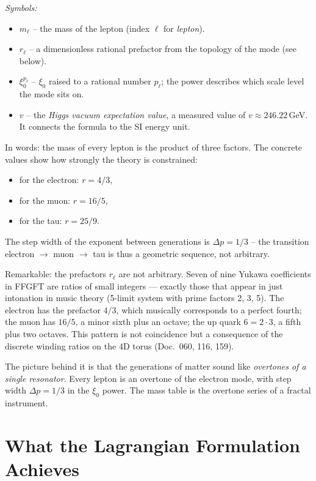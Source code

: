 \noindent\textit{Symbols:}
\begin{itemize}\setlength\itemsep{0pt}
  \item $m_\ell$ -- the mass of the lepton (index $\ell$ for
        \emph{lepton}).
  \item $r_\ell$ -- a dimensionless rational prefactor from the
        topology of the mode (see below).
  \item $\xi_0^{p_\ell}$ -- $\xi_0$ raised to a rational number
        $p_\ell$; the power describes which scale level the mode
        sits on.
  \item $v$ -- the \emph{Higgs vacuum expectation value}, a measured
        value of $v \approx 246{.}22$\,GeV. It connects the formula
        to the SI energy unit.
\end{itemize}

\medskip\noindent

In words: the mass of every lepton is the product of three factors.
The concrete values show how strongly the theory is constrained:
\begin{itemize}
  \item for the electron: $r = 4/3$,
  \item for the muon: $r = 16/5$,
  \item for the tau: $r = 25/9$.
\end{itemize}
The step width of the exponent between generations is
$\Delta p = 1/3$ -- the transition electron $\to$ muon $\to$ tau is
thus a geometric sequence, not arbitrary.

Remarkable: the prefactors $r_\ell$ are not arbitrary. Seven of
nine Yukawa coefficients in FFGFT are ratios of small integers ---
exactly those that appear in just intonation in music theory
(5-limit system with prime factors 2, 3, 5). The electron has the
prefactor $4/3$, which musically corresponds to a perfect fourth;
the muon has $16/5$, a minor sixth plus an octave; the up quark
$6 = 2 \cdot 3$, a fifth plus two octaves. This pattern is not
coincidence but a consequence of the discrete winding ratios on the
4D torus (Doc.~060, 116, 159).

The picture behind it is that the generations of matter sound like
\emph{overtones of a single resonator}. Every lepton is an overtone
of the electron mode, with step width $\Delta p = 1/3$ in the
$\xi_0$ power. The mass table is the overtone series of a fractal
instrument.

\section{What the Lagrangian Formulation Achieves}

